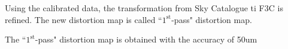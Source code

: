 Using the calibrated data, the transformation from Sky Catalogue ti F3C is refined.
The new distortion map is called ``$1^\mathrm{st}$-pass" distortion map.



\begin{itembox}[l]{}
The ``$1^\mathrm{st}$-pass" distortion map is obtained with the accuracy of 50um

\end{itembox}